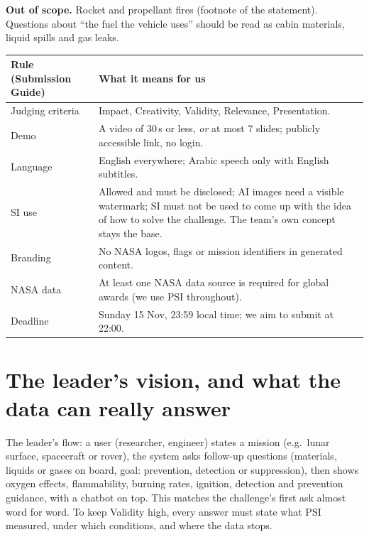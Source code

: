 \documentclass[10pt,a4paper]{article}
\begin{document}
\textbf{Out of scope.} Rocket and propellant fires (footnote of the statement). Questions about ``the fuel the vehicle uses'' should be read as cabin materials, liquid spills and gas leaks.

\begin{tabularx}{\linewidth}{@{}lL@{}}
\toprule
\textbf{Rule (Submission Guide)} & \textbf{What it means for us}\\
\midrule
Judging criteria & Impact, Creativity, Validity, Relevance, Presentation.\\
Demo & A video of 30\,s or less, \emph{or} at most 7 slides; publicly accessible link, no login.\\
Language & English everywhere; Arabic speech only with English subtitles.\\
SI use & Allowed and must be disclosed; AI images need a visible watermark; SI must not be used to come up with the idea of how to solve the challenge. The team's own concept stays the base.\\
Branding & No NASA logos, flags or mission identifiers in generated content.\\
NASA data & At least one NASA data source is required for global awards (we use PSI throughout).\\
Deadline & Sunday 15 Nov, 23:59 local time; we aim to submit at 22:00.\\
\bottomrule
\end{tabularx}

\section{The leader's vision, and what the data can really answer}

The leader's flow: a user (researcher, engineer) states a mission (e.g.\ lunar surface, spacecraft or rover), the system asks follow-up questions (materials, liquids or gases on board, goal: prevention, detection or suppression), then shows oxygen effects, flammability, burning rates, ignition, detection and prevention guidance, with a chatbot on top. This matches the challenge's first ask almost word for word. To keep Validity high, every answer must state what PSI measured, under which conditions, and where the data stops.
\end{document}
